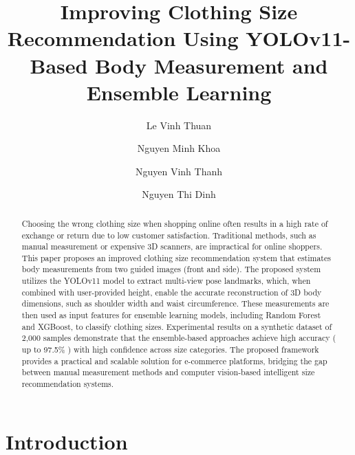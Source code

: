 \documentclass{llncs}
\begin{document}
\title{Improving Clothing Size Recommendation Using YOLOv11-Based Body Measurement and Ensemble Learning}

\author{Le Vinh Thuan \and Nguyen Minh Khoa \and Nguyen Vinh Thanh \and Nguyen Thi Dinh }



\maketitle

\begin{abstract}
    Choosing the wrong clothing size when shopping online often results in a high rate of exchange or return due to low customer satisfaction. 
    Traditional methods, such as manual measurement or expensive 3D scanners, are impractical for online shoppers. 
    This paper proposes an improved clothing size recommendation system that estimates body measurements from two guided images (front and side). 
    The proposed system utilizes the YOLOv11 model to extract multi-view pose landmarks, 
        which, when combined with user-provided height, enable the accurate reconstruction of 3D body dimensions, such as shoulder width and waist circumference. 
    These measurements are then used as input features for ensemble learning models, including Random Forest and XGBoost, to classify clothing sizes. 
    Experimental results on a synthetic dataset of 2,000 samples demonstrate that the ensemble-based approaches achieve high accuracy ( up to 97.5\% ) with high confidence across size categories. 
    The proposed framework provides a practical and scalable solution for e-commerce platforms, 
        bridging the gap between manual measurement methods and computer vision-based intelligent size recommendation systems.
\end{abstract}



\section{Introduction}
\end{document}
